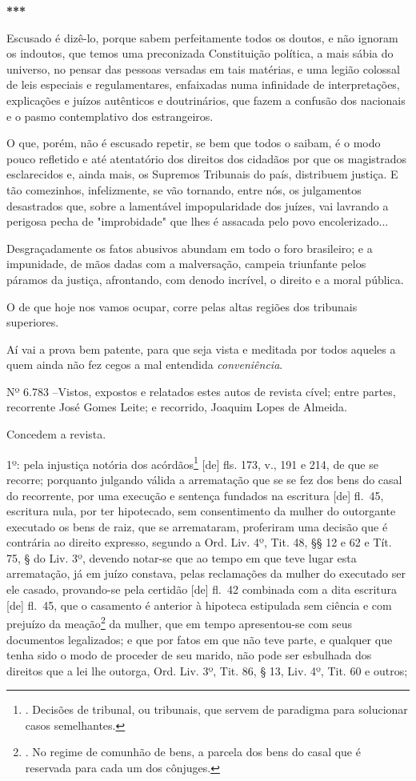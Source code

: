 \textbf{***}

Escusado é dizê-lo, porque sabem perfeitamente todos os doutos, e não
ignoram os indoutos, que temos uma preconizada Constituição política, a
mais sábia do universo, no pensar das pessoas versadas em tais matérias,
e uma legião colossal de leis especiais e regulamentares, enfaixadas
numa infinidade de interpretações, explicações e juízos autênticos e
doutrinários, que fazem a confusão dos nacionais e o pasmo contemplativo
dos estrangeiros.

O que, porém, não é escusado repetir, se bem que todos o saibam, é o
modo pouco refletido e até atentatório dos direitos dos cidadãos por que
os magistrados esclarecidos e, ainda mais, os Supremos Tribunais do
país, distribuem justiça. E tão comezinhos, infelizmente, se vão
tornando, entre nós, os julgamentos desastrados que, sobre a lamentável
impopularidade dos juízes, vai lavrando a perigosa pecha de
"improbidade" que lhes é assacada pelo povo encolerizado...

Desgraçadamente os fatos abusivos abundam em todo o foro brasileiro; e a
impunidade, de mãos dadas com a malversação, campeia triunfante pelos
páramos da justiça, afrontando, com denodo incrível, o direito e a moral
pública.

O de que hoje nos vamos ocupar, corre pelas altas regiões dos tribunais
superiores.

Aí vai a prova bem patente, para que seja vista e meditada por todos
aqueles a quem ainda não fez cegos a mal entendida \emph{conveniência}.

Nº 6.783 --Vistos, expostos e relatados estes autos de revista cível;
entre partes, recorrente José Gomes Leite; e recorrido, Joaquim Lopes de
Almeida.

Concedem a revista.

1º: pela injustiça notória dos acórdãos\footnote{. Decisões de tribunal,
  ou tribunais, que servem de paradigma para solucionar casos
  semelhantes.} {[}de{]} fls. 173, v., 191 e 214, de que se recorre;
porquanto julgando válida a arrematação que se se fez dos bens do casal
do recorrente, por uma execução e sentença fundados na escritura
{[}de{]} fl.~45, escritura nula, por ter hipotecado, sem consentimento
da mulher do outorgante executado os bens de raiz, que se arremataram,
proferiram uma decisão que é contrária ao direito expresso, segundo a
Ord. Liv. 4º, Tit. 48, §§ 12 e 62 e Tít. 75, § do Liv. 3º, devendo
notar-se que ao tempo em que teve lugar esta arrematação, já em juízo
constava, pelas reclamações da mulher do executado ser ele casado,
provando-se pela certidão {[}de{]} fl.~42 combinada com a dita escritura
{[}de{]} fl.~45, que o casamento é anterior à hipoteca estipulada sem
ciência e com prejuízo da meação\footnote{. No regime de comunhão de
  bens, a parcela dos bens do casal que é reservada para cada um dos
  cônjuges.} da mulher, que em tempo apresentou-se com seus documentos
legalizados; e que por fatos em que não teve parte, e qualquer que tenha
sido o modo de proceder de seu marido, não pode ser esbulhada dos
direitos que a lei lhe outorga, Ord. Liv. 3º, Tit. 86, § 13, Liv. 4º,
Tit. 60 e outros;

